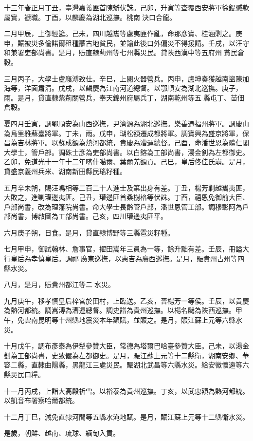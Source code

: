 \begin{pinyinscope}
十三年春正月丁丑，臺灣嘉義匪首陳辦伏誅。己卯，升寅等查覆西安將軍徐錕贓款屬實，褫職。丁酉，以麟慶為湖北巡撫。桃南決口合龍。

二月甲辰，上御經筵。己未，四川越巂等處夷匪作亂，命那彥寶、桂涵剿之。庚申，賑被災多倫諾爾租種蒙古地貧民，並諭此後口外偏災不得援請。壬戌，以汪守和兼署吏部尚書。是月，賑直隸薊州等七州縣災民。貸陜西漢中等五府州貧民倉穀。

三月丙子，大學士盧廕溥致仕。辛巳，上閱火器營兵。丙申，盧坤奏獲越南盜陳加海等，洋面肅清。戊戌，以麟慶為江南河道總督。以鄂順安為湖北巡撫。庚子，雨。是月，貸直隸紫荊關營兵，奉天錦州府屬兵丁，湖南乾州等五縣屯丁、苗佃倉穀。

夏四月壬寅，調鄂順安為山西巡撫，尹濟源為湖北巡撫。樂善遷福州將軍。調慶山為烏里雅蘇臺將軍。丁未，雨。戊申，瑚松額遷成都將軍。調寶興為盛京將軍，保昌為吉林將軍。以蘇成額為熱河都統，貴慶為漕運總督。己酉，命潘世恩為體仁閣大學士，管戶部。調硃士彥為吏部尚書。以白鎔為工部尚書，湯金釗為左都御史。乙卯，免道光十一年十二年喀什噶爾、葉爾羌額貢。己巳，皇后佟佳氏崩。是月，貸盛京義州兵米、湖南新田縣民瑤籽種。

五月辛未朔，賜汪鳴相等二百二十人進士及第出身有差。丁丑，楊芳剿越巂夷匪，大敗之，進剿瓘邊夷匪。己丑，瓘邊匪首桑樹格等伏誅。丁酉，禧恩免御前大臣、戶部尚書，改為理籓院尚書。命大學士長齡管戶部，潘世恩管工部。調穆彰阿為戶部尚書，博啟圖為工部尚書。己亥，四川瓘邊夷匪平。

六月庚子朔，日食。是月，貸直隸博野等三縣雹災籽種。

七月甲申，御試翰林、詹事官，擢田嵩年三員為一等，餘升黜有差。壬辰，冊謚大行皇后為孝慎皇后。調祁廣東巡撫，以惠吉為廣西巡撫。是月，賑貴州古州等四縣水災。

八月，是月，賑貴州都江等二水災。

九月庚午，移孝慎皇后梓宮於田村，上臨送。乙亥，晉楊芳一等侯。壬辰，以貴慶為熱河都統。調嵩溥為漕運總督。調史譜為貴州巡撫。以楊名颺為陜西巡撫。甲午，免雲南昆明等十州縣地震災本年額賦，並賑之。是月，賑江蘇上元等六縣水災。

十月戊午，調布彥泰為伊犁參贊大臣，常德為塔爾巴哈臺參贊大臣。己未，以湯金釗為工部尚書，史致儼為左都御史。是月，賑江蘇上元等十二縣衛，湖南安鄉、華容二縣，直隸曲陽縣，黑龍江三處災民。賑湖北武昌等六縣水災。給安徽懷遠等六縣災民口糧。

十一月丙戌，上詣大高殿祈雪。以裕泰為貴州巡撫。丁亥，以武忠額為熱河都統。以凱音布署察哈爾都統。

十二月丁巳，減免直隸河間等五縣水淹地賦。是月，賑江蘇上元等十二縣衛水災。

是歲，朝鮮、越南、琉球、緬甸入貢。


\end{pinyinscope}
